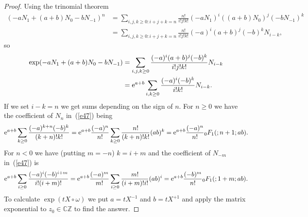 \documentclass[10pt,a4paper]{amsart}
\numberwithin{equation}{section}
\newcommand{\C}{\mathbb{C}}
\newcommand{\Z}{\mathbb{Z}}
\newcommand{\<}{\langle}
\renewcommand{\>}{\rangle}
\begin{document}
\begin{proof}
	Using the trinomial theorem
	\begin{align*}
	(-a N_{1}+(a+b)N_{0}-bN_{-1})^{n}&=\sum_{i,j,k\geq 0:i+j+k=n} \frac{n!}{i! j! k!} (-a N_{1})^{i}((a+b)N_{0})^{j}(-bN_{-1})^{k}\\
	&=\sum_{i,j,k\geq 0:i+j+k=n} \frac{n!}{i! j! k!} (-a)^{i}(a+b)^{j}(-b)^{k} N_{i-k},
	\end{align*}
	so
	\begin{align}
	\exp (-a N_{1}+(a+b)N_{0}-bN_{-1})&=\sum_{i,j,k\geq 0}\frac{(-a)^{i}(a+b)^{j}(-b)^{k} }{i! j! k!} N_{i-k}\nonumber\\
	&={\rm e}^{a+b}\sum_{i,k\geq 0}\frac{(-a)^{i}(-b)^{k} }{i! k!}N_{i-k}.\label{e47}
	\end{align}
	If we set $ i-k =n$ we get sums depending on the sign of $ n $. For $ n \geq 0 $ we have the coefficient of $ N_{n} $ in~(\ref{e47}) being
	\begin{gather*}%
	{\rm e}^{a+b}\sum_{k\geq 0}\frac{(-a)^{k+n}(-b)^{k} }{(k+n)! k!}=	{\rm e}^{a+b}\frac{(-a)^{n}}{n!}\sum_{k\geq 0}\frac{n! }{(k+n)! k!}(a b)^{k}=	{\rm e}^{a+b}\frac{(-a)^{n}}{n!}{}_{0}F_{1}(;n+1 ;ab).
	\end{gather*}
	For $ n< 0 $ we have (putting $ m=-n $) $ k=i+m $ and the coefficient of $ N_{-m} $ in~(\ref{e47}) is
	\begin{gather*}
	{\rm e}^{a+b}\sum_{i\geq 0}\frac{(-a)^{i}(-b)^{i+m} }{i! (i+m)! }=	{\rm e}^{a+b}\frac{(-a)^{m}}{m!}\sum_{i\geq 0}\frac{m! }{(i+m)! i!}(a b)^{i}= {\rm e}^{a+b}\frac{(-b)^{m}}{n!}{}_{0}F_{1}(;1+m ;ab).
	\end{gather*}
To calculate $ \exp (t X \circ \omega) $ we put $ a=tX^{-1} $ and $ b=tX^{+1} $ and apply the matrix exponential to $ z_{0}\in \C \Z $ to find the answer.
\end{proof}
\end{document}
